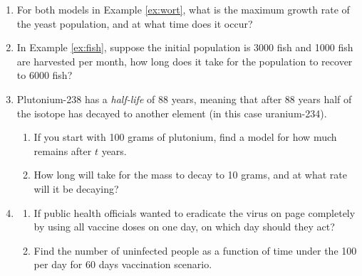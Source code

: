 \begin{exercises}

	\begin{enumerate}

		
		\item For both models in Example \ref{ex:wort}, what is the maximum growth rate of the yeast population, and at what time does it occur?
	
	
		\item In Example \ref{ex:fish}, suppose the initial population is 3000 fish and 1000 fish are harvested per month, how long does it take for the population to recover to 6000 fish?
		
		

	
	
	  \item Plutonium-238 has a \emph{half-life} of 88 years, meaning that after 88 years half of the isotope has decayed to another element (in this case uranium-234).
	  \begin{enumerate}
	  	\item If you start with 100 grams of plutonium, find a model for how much remains after $t$ years.
	  	\item How long will take for the mass to decay to 10 grams, and at what rate will it be decaying? 
	  \end{enumerate}
  
	
		\item\begin{enumerate}
		  \item If public health officials wanted to eradicate the virus on page \pageref{pg:virus} completely by using all vaccine doses on one day, on which day should they act?
		  \item Find the number of uninfected people as a function of time under the 100 per day for 60 days vaccination scenario.
		\end{enumerate}
	\end{enumerate}
\end{exercises}

\fi